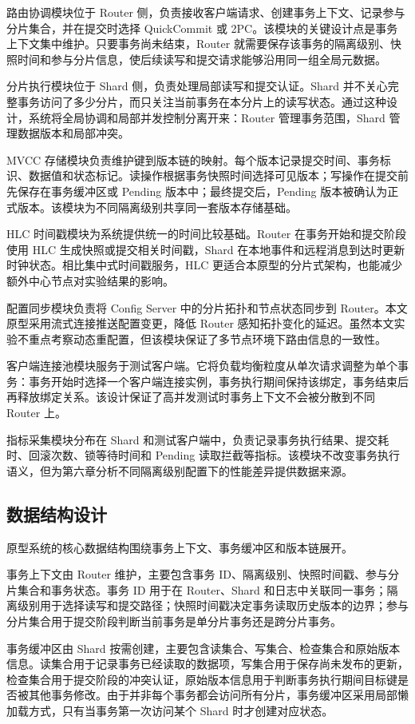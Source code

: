 路由协调模块位于 Router 侧，负责接收客户端请求、创建事务上下文、记录参与分片集合，并在提交时选择 QuickCommit 或 2PC。该模块的关键设计点是事务上下文集中维护。只要事务尚未结束，Router 就需要保存该事务的隔离级别、快照时间和参与分片信息，使后续读写和提交请求能够沿用同一组全局元数据。

分片执行模块位于 Shard 侧，负责处理局部读写和提交认证。Shard 并不关心完整事务访问了多少分片，而只关注当前事务在本分片上的读写状态。通过这种设计，系统将全局协调和局部并发控制分离开来：Router 管理事务范围，Shard 管理数据版本和局部冲突。

MVCC 存储模块负责维护键到版本链的映射。每个版本记录提交时间、事务标识、数据值和状态标记。读操作根据事务快照时间选择可见版本；写操作在提交前先保存在事务缓冲区或 Pending 版本中；最终提交后，Pending 版本被确认为正式版本。该模块为不同隔离级别共享同一套版本存储基础。

HLC 时间戳模块为系统提供统一的时间比较基础。Router 在事务开始和提交阶段使用 HLC 生成快照或提交相关时间戳，Shard 在本地事件和远程消息到达时更新时钟状态。相比集中式时间戳服务，HLC 更适合本原型的分片式架构，也能减少额外中心节点对实验结果的影响。

配置同步模块负责将 Config Server 中的分片拓扑和节点状态同步到 Router。本文原型采用流式连接推送配置变更，降低 Router 感知拓扑变化的延迟。虽然本文实验不重点考察动态重配置，但该模块保证了多节点环境下路由信息的一致性。

客户端连接池模块服务于测试客户端。它将负载均衡粒度从单次请求调整为单个事务：事务开始时选择一个客户端连接实例，事务执行期间保持该绑定，事务结束后再释放绑定关系。该设计保证了高并发测试时事务上下文不会被分散到不同 Router 上。

指标采集模块分布在 Shard 和测试客户端中，负责记录事务执行结果、提交耗时、回滚次数、锁等待时间和 Pending 读取拦截等指标。该模块不改变事务执行语义，但为第六章分析不同隔离级别配置下的性能差异提供数据来源。

\subsection{数据结构设计}

原型系统的核心数据结构围绕事务上下文、事务缓冲区和版本链展开。

事务上下文由 Router 维护，主要包含事务 ID、隔离级别、快照时间戳、参与分片集合和事务状态。事务 ID 用于在 Router、Shard 和日志中关联同一事务；隔离级别用于选择读写和提交路径；快照时间戳决定事务读取历史版本的边界；参与分片集合用于提交阶段判断当前事务是单分片事务还是跨分片事务。

事务缓冲区由 Shard 按需创建，主要包含读集合、写集合、检查集合和原始版本信息。读集合用于记录事务已经读取的数据项，写集合用于保存尚未发布的更新，检查集合用于提交阶段的冲突认证，原始版本信息用于判断事务执行期间目标键是否被其他事务修改。由于并非每个事务都会访问所有分片，事务缓冲区采用局部懒加载方式，只有当事务第一次访问某个 Shard 时才创建对应状态。

